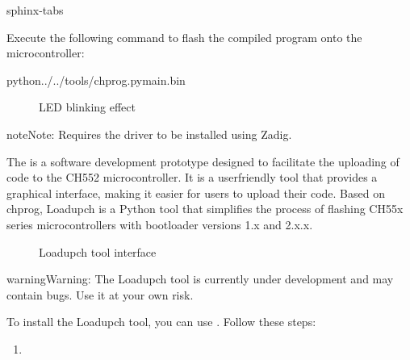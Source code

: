 \documentclass[letterpaper,10pt,english]{sphinxmanual}
\begin{document}
\begin{sphinxuseclass}{sphinx-tabs}
\begin{enumerate}
\sphinxAtStartPar
Execute the following command to flash the compiled program onto the microcontroller:

\begin{sphinxVerbatim}[commandchars=\\\{\}]
python../../tools/chprog.pymain.bin
\end{sphinxVerbatim}

\end{enumerate}

\begin{figure}[htbp]
\centering
\capstart

\noindent{}
\caption{LED blinking effect}\label{\detokenize{compile:id19}}\label{\detokenize{compile:id5}}\end{figure}

\begin{sphinxadmonition}{note}{Note:}
\sphinxAtStartPar
Requires the  driver to be installed using Zadig.
\end{sphinxadmonition}

\sphinxAtStartPar
{}

\sphinxAtStartPar
The  is a software development prototype designed to facilitate the uploading of code to the CH552 microcontroller.
It is a user\sphinxhyphen{}friendly tool that provides a graphical interface, making it easier for users to upload their code.
Based on chprog, Loadupch is a Python tool that simplifies the process of flashing CH55x series microcontrollers with bootloader versions 1.x and 2.x.x.

\begin{figure}[htbp]
\centering
\capstart

\noindent{}
\caption{Loadupch tool interface}\label{\detokenize{compile:id20}}\label{\detokenize{compile:id9}}\end{figure}

\begin{sphinxadmonition}{warning}{Warning:}
\sphinxAtStartPar
The Loadupch tool is currently under development and may contain bugs. Use it at your own risk.
\end{sphinxadmonition}

\sphinxAtStartPar
To install the Loadupch tool, you can use . Follow these steps:
\begin{enumerate}
%
\item {} 
\sphinxAtStartPar
{}


\end{enumerate}
\end{sphinxuseclass}
\end{document}
